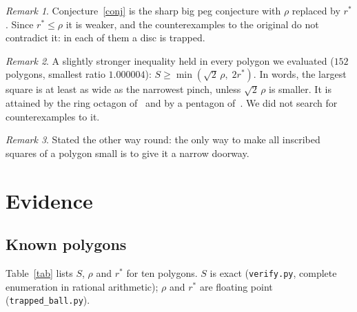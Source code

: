 \documentclass[11pt,a4paper]{article}
\theoremstyle{definition}\newtheorem{definition}{Definition}
\theoremstyle{remark}\newtheorem{remark}{Remark}
\begin{document}
\begin{remark}
Conjecture~\ref{conj} is the sharp big peg conjecture with $\rho$ replaced by
$r^*$. Since $r^*\le\rho$ it is weaker, and the counterexamples to the original
do not contradict it: in each of them a disc is trapped.
\end{remark}

\begin{remark}
A slightly stronger inequality held in every polygon we evaluated ($152$
polygons, smallest ratio $1.000004$): $S\ge\min(\sqrt2\,\rho,\;2r^*)$. In words,
the largest square is at least as wide as the narrowest pinch, unless
$\sqrt2\,\rho$ is smaller. It is attained by the ring octagon of~\cite{small}
and by a pentagon of~\cite{ss}. We did not search for counterexamples to it.
\end{remark}

\begin{remark}
Stated the other way round: the only way to make all inscribed squares of a
polygon small is to give it a narrow doorway.
\end{remark}

\section{Evidence}\label{sec:evidence}

\subsection*{Known polygons}

Table~\ref{tab} lists $S$, $\rho$ and $r^*$ for ten polygons. $S$ is exact
(\texttt{verify.py}, complete enumeration in rational arithmetic); $\rho$ and
$r^*$ are floating point (\texttt{trapped\_ball.py}).
\end{document}
